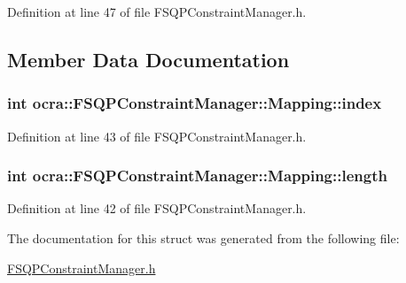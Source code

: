 Definition at line 47 of file F\+S\+Q\+P\+Constraint\+Manager.\+h.



\subsection{Member Data Documentation}
\subsubsection[{\texorpdfstring{index}{index}}]{\setlength{\rightskip}{0pt plus 5cm}int ocra\+::\+F\+S\+Q\+P\+Constraint\+Manager\+::\+Mapping\+::index}\hypertarget{structocra_1_1FSQPConstraintManager_1_1Mapping_a10fd8eae295eb4d5f9dc4258b065275b}{}\label{structocra_1_1FSQPConstraintManager_1_1Mapping_a10fd8eae295eb4d5f9dc4258b065275b}


Definition at line 43 of file F\+S\+Q\+P\+Constraint\+Manager.\+h.

\subsubsection[{\texorpdfstring{length}{length}}]{\setlength{\rightskip}{0pt plus 5cm}int ocra\+::\+F\+S\+Q\+P\+Constraint\+Manager\+::\+Mapping\+::length}\hypertarget{structocra_1_1FSQPConstraintManager_1_1Mapping_a223da0da4c89d6cbc8d025a867943194}{}\label{structocra_1_1FSQPConstraintManager_1_1Mapping_a223da0da4c89d6cbc8d025a867943194}


Definition at line 42 of file F\+S\+Q\+P\+Constraint\+Manager.\+h.



The documentation for this struct was generated from the following file\+:\begin{DoxyCompactItemize}
\item 
\hyperlink{FSQPConstraintManager_8h}{F\+S\+Q\+P\+Constraint\+Manager.\+h}\end{DoxyCompactItemize}
